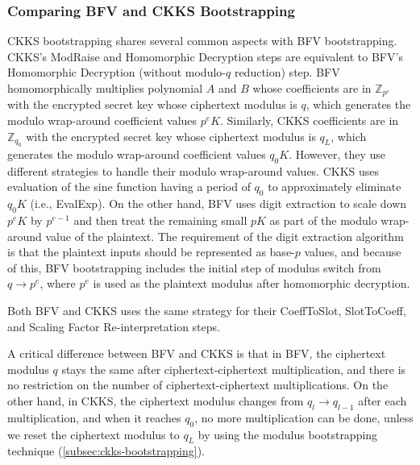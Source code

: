 \subsubsection{Comparing BFV and CKKS Bootstrapping}
\label{subsubsec:bfv-bootstrapping-ckks-comparison}

CKKS bootstrapping shares several common aspects with BFV bootstrapping. CKKS's \textsf{ModRaise} and \textsf{Homomorphic Decryption} steps are equivalent to BFV's \textsf{Homomorphic Decryption (without modulo-$q$ reduction)} step. BFV homomorphically multiplies polynomial $A$ and $B$ whose coefficients are in $\mathbb{Z}_{p^e}$ with the encrypted secret key whose ciphertext modulus is $q$, which generates the modulo wrap-around coefficient values $p^eK$. Similarly, CKKS coefficients are in $\mathbb{Z}_{q_0}$ with the encrypted secret key whose ciphertext modulus is $q_L$, which generates the modulo wrap-around coefficient values $q_0K$. However, they use different strategies to handle their modulo wrap-around values. CKKS uses evaluation of the sine function having a period of $q_0$ to approximately eliminate $q_0K$ (i.e., \textsf{EvalExp}). On the other hand, BFV uses digit extraction to scale down $p^eK$ by $p^{e-1}$ and then treat the remaining small $pK$ as part of the modulo wrap-around value of the plaintext. The requirement of the digit extraction algorithm is that the plaintext inputs should be represented as base-$p$ values, and because of this, BFV bootstrapping includes the initial step of modulus switch from $q \rightarrow p^e$, where $p^e$ is used as the plaintext modulus after homomorphic decryption. 

Both BFV and CKKS uses the same strategy for their \textsf{CoeffToSlot}, \textsf{SlotToCoeff}, and \textsf{Scaling Factor Re-interpretation} steps. 

 A critical difference between BFV and CKKS is that in BFV, the ciphertext modulus $q$ stays the same after ciphertext-ciphertext multiplication, and there is no restriction on the number of ciphertext-ciphertext multiplications. On the other hand, in CKKS, the ciphertext modulus changes from $q_l \rightarrow q_{l-1}$ after each multiplication, and when it reaches $q_0$, no more multiplication can be done, unless we reset the ciphertext modulus to $q_L$ by using the modulus bootstrapping technique (\autoref{subsec:ckks-bootstrapping}). 

